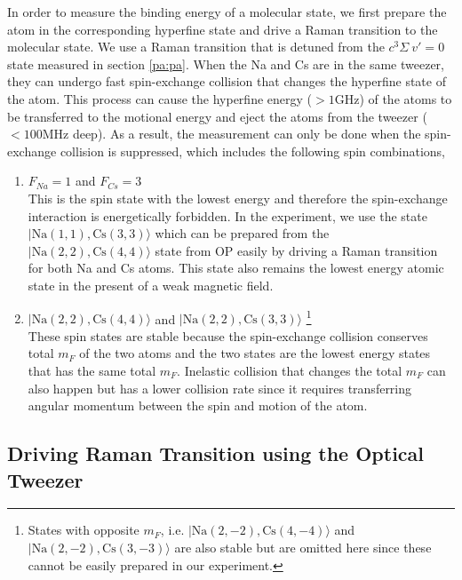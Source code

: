 In order to measure the binding energy of a molecular state,
we first prepare the atom in the corresponding hyperfine state
and drive a Raman transition to the molecular state.
We use a Raman transition that is detuned from the $c^3\Sigma\ v'=0$ state measured
in section \ref{pa:pa}.
When the Na and Cs are in the same tweezer,
they can undergo fast spin-exchange collision that changes the hyperfine state of the atom.
This process can cause the hyperfine energy ($>1\mathrm{GHz}$) of the atoms
to be transferred to the motional energy
and eject the atoms from the tweezer ($<100\mathrm{MHz}$ deep).
As a result, the measurement can only be done when the spin-exchange collision is suppressed,
which includes the following spin combinations,
\begin{enumerate}
\item $F_{Na}=1$ and $F_{Cs}=3$\\
  This is the spin state with the lowest energy and therefore the spin-exchange interaction
  is energetically forbidden.
  In the experiment, we use the state $|\mathrm{Na(1, 1),Cs(3, 3)}\rangle$
  which can be prepared from the $|\mathrm{Na(2, 2),Cs(4, 4)}\rangle$ state from OP
  easily by driving a Raman transition for both Na and Cs atoms.
  This state also remains the lowest energy atomic state in the present of a weak magnetic field.
\item $|\mathrm{Na(2, 2),Cs(4, 4)}\rangle$ and $|\mathrm{Na(2, 2),Cs(3, 3)}\rangle$
  \footnote{States with opposite $m_F$, i.e.
    $|\mathrm{Na(2, -2),Cs(4, -4)}\rangle$ and $|\mathrm{Na(2, -2),Cs(3, -3)}\rangle$ are also stable
    but are omitted here since these cannot be easily prepared in our experiment.}\\
  These spin states are stable because the spin-exchange collision conserves total $m_F$
  of the two atoms and
  the two states are the lowest energy states that has the same total $m_F$.
  Inelastic collision that changes the total $m_F$ can also happen
  but has a lower collision rate since it requires transferring angular momentum
  between the spin and motion of the atom.
\end{enumerate}

\subsection{Driving Raman Transition using the Optical Tweezer}

